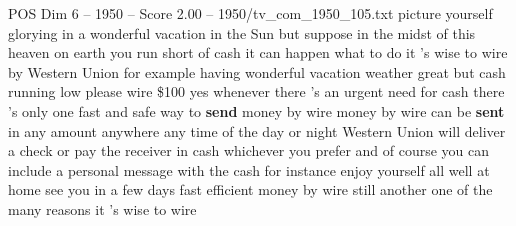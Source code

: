 \begin{textsample}{POS Dim 6 – 1950 – Score 2.00 – 1950/tv\_com\_1950\_105.txt}  \label{ex:f6_pos_007}
picture yourself glorying in a wonderful vacation in the Sun but suppose in the midst of this heaven on earth you run short of cash it can happen what to do it 's wise to wire by Western Union for example having wonderful vacation weather great but cash running low please wire \$100 yes whenever there 's an urgent need for cash there 's only one fast and safe way to \textbf{send} money by wire money by wire can be \textbf{sent} in any amount anywhere any time of the day or night Western Union will deliver a check or pay the receiver in cash whichever you prefer and of course you can include a personal message with the cash for instance enjoy yourself all well at home see you in a few days fast efficient money by wire still another one of the many reasons it 's wise to wire

\end{textsample}
